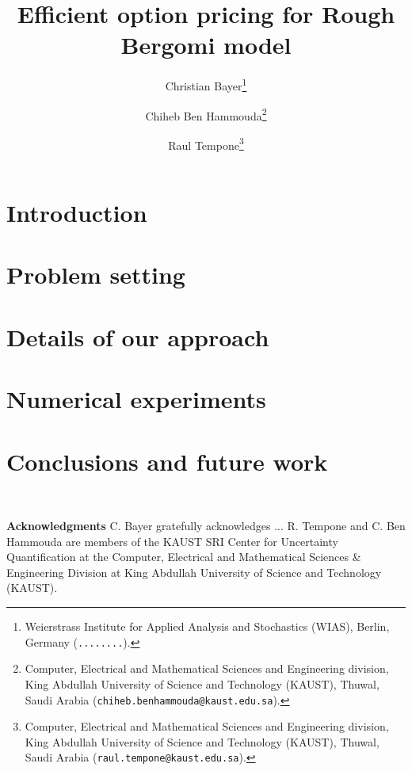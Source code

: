 \documentclass[11pt]{article}
\title{Efficient option pricing for Rough Bergomi model}
\author{Christian Bayer\thanks{
 Weierstrass Institute for Applied Analysis and Stochastics (WIAS),
 Berlin, Germany ({\tt........}).}
        \and Chiheb Ben Hammouda\thanks{Computer, Electrical and Mathematical Sciences and Engineering division,
 King Abdullah University of Science and Technology (KAUST),
 Thuwal, Saudi Arabia ({\tt chiheb.benhammouda@kaust.edu.sa}).} 
\and  Raul Tempone\thanks{Computer, Electrical and Mathematical Sciences and Engineering division,
 King Abdullah University of Science and Technology (KAUST),
 Thuwal, Saudi Arabia ({\tt raul.tempone@kaust.edu.sa}).}}
\begin{document}
\maketitle

\begin{abstract}
	  
\end{abstract}






\pagestyle{myheadings}
\thispagestyle{plain}

\setcounter{tocdepth}{1}


 \section{Introduction}




 \section{Problem setting}\label{sec:Problem setting}




\section{Details of our approach}\label{sec:Details our approach and error bounds}





\section{Numerical experiments}\label{sec:Numerical tests}




\section{Conclusions and future work}



\

\textbf{Acknowledgments} C. Bayer gratefully acknowledges ... R. Tempone and C. Ben Hammouda are members of the KAUST SRI Center for Uncertainty Quantification at the Computer, Electrical and Mathematical Sciences \& Engineering Division at King Abdullah University of Science and Technology (KAUST). 




 




\appendix







 

 

 
 
 
\end{document}
